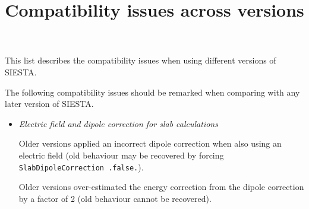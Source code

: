 \documentclass{article}
\title{Compatibility issues across versions}
\author{\siesta}
\newcommand\siesta{\textsc{SIESTA}}
\begin{document}
\maketitle

\clearpage

This list describes the compatibility issues when using different versions of \siesta.

\begin{description}
  \setlength\itemsep{1pt}
  \setlength\topsep{1pt}

  \item[0 --- 4.0-b2] The following compatibility issues should be remarked when
  comparing with any later version of \siesta.

  \begin{itemize}
    \item \emph{Electric field and dipole correction for slab calculations}

    Older versions applied an incorrect dipole correction when also using an
    electric field (old behaviour may be recovered by forcing \texttt{SlabDipoleCorrection .false.}). 

    Older versions over-estimated the energy correction from the dipole correction by a
    factor of 2 (old behaviour cannot be recovered).
    
  \end{itemize}

\end{description}
\end{document}
